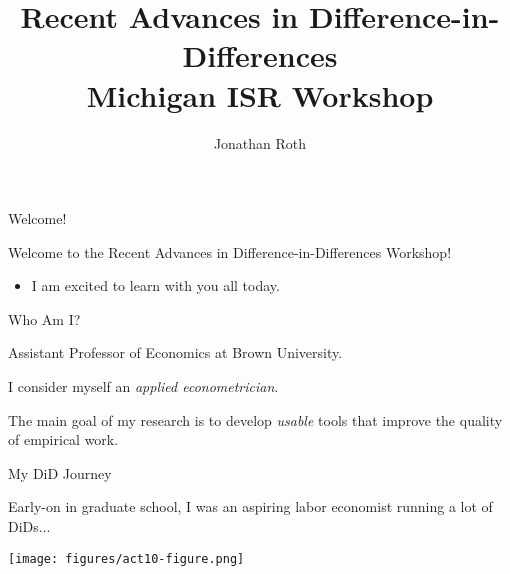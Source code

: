 \documentclass[aspectratio = 169, 12pt]{beamer}
\author{Jonathan Roth}
\title[Advances in DiD Workshop]{Recent Advances in Difference-in-Differences \\ Michigan ISR Workshop}
\begin{document}
\maketitle

\begin{frame}{Welcome!}
  \addtocounter{framenumber}{-1}

  Welcome to the Recent Advances in Difference-in-Differences Workshop!

  \medskip
  \begin{itemize}
    \item I am excited to learn with you all today.
  \end{itemize}

\end{frame}


\begin{frame}{Who Am I?}
  \begin{wideitemize}

    \item
    Assistant Professor of Economics at Brown University.

    \item
    I consider myself an \textit{applied econometrician}.

    \item
    The main goal of my research is to develop \textit{usable} tools that improve the quality of empirical work.

  \end{wideitemize}
\end{frame}


\begin{frame}{My DiD Journey}

  \begin{wideitemize}
    \item
    Early-on in graduate school, I was an aspiring labor economist running a lot of DiDs...

  \end{wideitemize}
  \centering
  \texttt{[image: figures/act10-figure.png]}

\end{frame}
\end{document}
